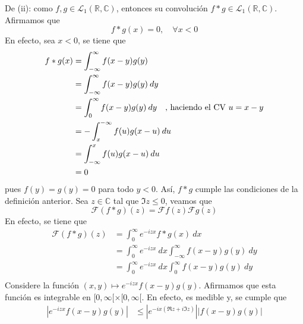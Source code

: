 \documentclass[12pt]{report}
\theoremstyle{largebreak}
\renewcommand{\leq}{\ensuremath{\leqslant}}
\newcommand\abs[1]{\ensuremath{\left|#1\right|}}
\newcommand{\fou}[1]{\ensuremath{\mathcal{F}#1}}
\begin{document}
\begin{sol}
        De (ii): como $f,g\in\mathcal{L}_1(\mathbb{R},\mathbb{C})$, entonces su convolución $f*g\in\mathcal{L}_1(\mathbb{R},\mathbb{C})$. Afirmamos que
        \begin{equation*}
            f*g(x)=0,\quad\forall x<0
        \end{equation*}
        En efecto, sea $x<0$, se tiene que
        \begin{equation*}
            \begin{split}
                f*g(x)&=\int_{-\infty}^{\infty}f(x-y)g(y)\\
                &=\int_{-\infty}^{\infty}f(x-y)g(y)\:dy\\
                &=\int_{0}^{\infty}f(x-y)g(y)\:dy\quad\textup{, haciendo el CV }u=x-y\\
                &=-\int_{x}^{-\infty}f(u)g(x-u)\:du\\
                &=\int_{-\infty}^{x}f(u)g(x-u)\:du\\
                &=0\\
            \end{split}
        \end{equation*}
        pues $f(y)=g(y)=0$ para todo $y<0$. Así, $f*g$ cumple las condiciones de la definición anterior. Sea $z\in\mathbb{C}$ tal que $\Im z\leq0$, veamos que
        \begin{equation*}
            \fou{(f*g)}(z)=\fou{f}(z)\fou{g}(z)
        \end{equation*}
        En efecto, se tiene que
        \begin{equation*}
            \begin{split}
                \fou{(f*g)}(z)&=\int_0^{\infty}e^{ -izx}f*g(x)\:dx\\
                &=\int_0^{\infty}e^{ -izx}\:dx\int_{-\infty}^{\infty}f(x-y)g(y)\:dy\\
                &=\int_0^{\infty}e^{ -izx}\:dx\int_{0}^{\infty}f(x-y)g(y)\:dy\\
            \end{split}
        \end{equation*}
        Considere la función $(x,y)\mapsto e^{ -izx}f(x-y)g(y)$. Afirmamos que esta función es integrable en $[0,\infty[\times[0,\infty[$. En efecto, es medible y, se cumple que
        \begin{equation*}
            \begin{split}
                \abs{e^{ -izx}f(x-y)g(y)}&\leq\abs{e^{ -ix(\Re z+i\Im z)}}\abs{f(x-y)g(y)}\\

\end{split}
\end{equation*}
\end{sol}
\end{document}
